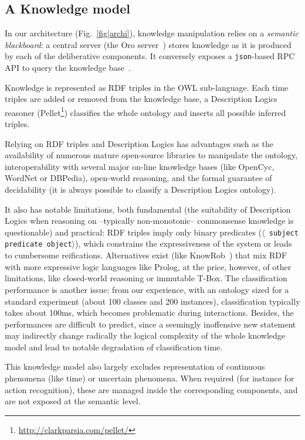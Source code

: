 \documentclass[preprint,5p]{elsarticle}
\newcommand{\stmt}[1]{{\footnotesize \tt $\langle$ #1\relax$\rangle$}}
\begin{document}
\subsection{A Knowledge model}

In our architecture (Fig.~\ref{fig|archi}), knowledge manipulation relies on a
\emph{semantic blackboard}: a central server (the {\sc Oro}
server~\cite{Lemaignan2010}) stores knowledge as it is produced by each of the
deliberative components. It conversely exposes a {\tt json}-based RPC API to
query the knowledge base~\cite{lemaignan2012kbapi}.

Knowledge is represented as RDF triples in the OWL sub-language. Each
time triples are added or removed from the knowledge base, a Description
Logics reasoner ({\sc Pellet}\footnote{\url{http://clarkparsia.com/pellet/}})
classifies the whole ontology and inserts all possible inferred triples.

Relying on RDF triples and Description Logics has advantages such as the
availability of numerous mature open-source libraries to manipulate the ontology,
interoperability with several major on-line knowledge bases (like {\sc
OpenCyc}, {\sc WordNet} or {\sc DBPedia}), open-world reasoning, and the formal
guarantee of decidability (it is always possible to classify a Description
Logics ontology).

It also has notable limitations, both fundamental (the suitability
of Description Logics when reasoning on --typically non-monotonic-- commonsense
knowledge is questionable) and practical: RDF triples imply only binary predicates
(\stmt{subject predicate object}), which constrains the expressiveness of the
system or leads to cumbersome reifications. Alternatives exist (like {\sc
KnowRob}~\cite{Tenorth2009a}) that mix RDF with more expressive logic
languages like {\sc Prolog}, at the price, however, of other limitations, like
closed-world reasoning or immutable T-Box. The classification
performance is another issue: from our experience, with an ontology sized for a
standard experiment (about 100 classes and 200 instances), classification
typically takes about 100ms, which becomes problematic during interactions.
Besides, the performances are difficult to predict, since a seemingly
inoffensive new statement may indirectly change radically the logical
complexity of the whole knowledge model and lead to notable degradation of
classification time.

This knowledge model also largely excludes representation of continuous
phenomena (like time) or uncertain phenomena. When required (for instance for
action recognition), these are managed inside the corresponding components, and
are not exposed at the semantic level.
\end{document}
